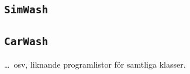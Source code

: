 \documentclass[a4paper]{article}
\newcommand{\code}[1]{\texttt{#1}} %
\begin{document}
\subsection{\code{SimWash}}


\subsection{\code{CarWash}}


\ldots\ osv, liknande programlistor för samtliga klasser.
\end{document}
